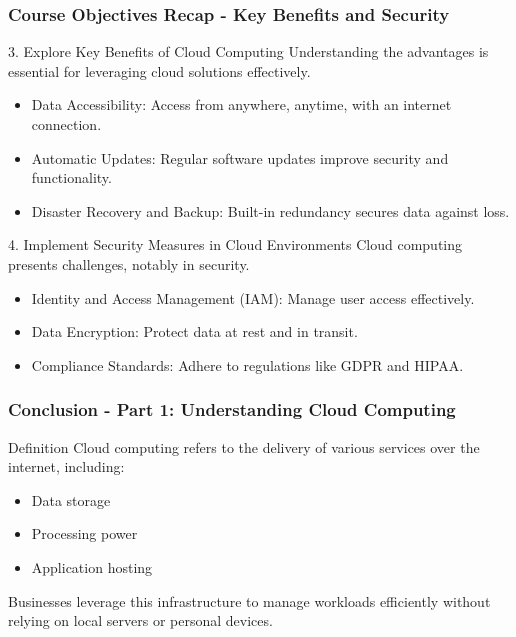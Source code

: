 \documentclass[aspectratio=169]{beamer}
\begin{document}
\begin{frame}[fragile]
    \frametitle{Course Objectives Recap - Key Benefits and Security}
    
    \begin{block}{3. Explore Key Benefits of Cloud Computing}
        Understanding the advantages is essential for leveraging cloud solutions effectively.
    \end{block}
    
    \begin{itemize}
        \item Data Accessibility: Access from anywhere, anytime, with an internet connection.
        \item Automatic Updates: Regular software updates improve security and functionality.
        \item Disaster Recovery and Backup: Built-in redundancy secures data against loss.
    \end{itemize}
    
    \begin{block}{4. Implement Security Measures in Cloud Environments}
        Cloud computing presents challenges, notably in security.
    \end{block}

    \begin{itemize}
        \item Identity and Access Management (IAM): Manage user access effectively.
        \item Data Encryption: Protect data at rest and in transit.
        \item Compliance Standards: Adhere to regulations like GDPR and HIPAA.
    \end{itemize}
\end{frame}

\begin{frame}[fragile]
    \frametitle{Conclusion - Part 1: Understanding Cloud Computing}
    \begin{block}{Definition}
        Cloud computing refers to the delivery of various services over the internet, including:
        \begin{itemize}
            \item Data storage
            \item Processing power
            \item Application hosting
        \end{itemize}
        Businesses leverage this infrastructure to manage workloads efficiently without relying on local servers or personal devices.
    \end{block}
\end{frame}
\end{document}
